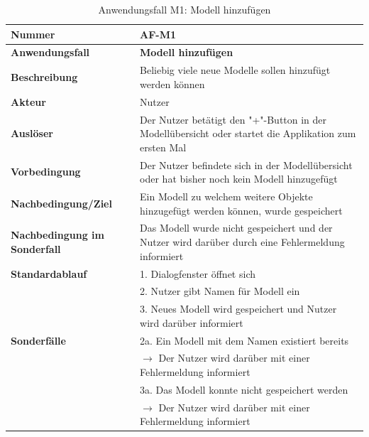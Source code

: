 \documentclass[oneside]{ausarbeitung}
\begin{document}
\begin{table}[htbp]
	\centering
	\begin{tabular}{|l|p{80mm}|}
		\hline
		\textbf{Nummer} & \textbf{AF-M1} \\ \hline
		\textbf{Anwendungsfall} & \textbf{Modell hinzufügen} \\ \hline
		\textbf{Beschreibung} & Beliebig viele neue Modelle sollen hinzufügt werden können \\ \hline
		\textbf{Akteur} & Nutzer \\ \hline
		\textbf{Auslöser} & Der Nutzer betätigt den "+"-Button in der Modellübersicht oder startet die Applikation zum ersten Mal  \\ \hline
		\textbf{Vorbedingung} & Der Nutzer befindete sich in der Modellübersicht oder hat bisher noch kein Modell hinzugefügt  \\ \hline	
		\textbf{Nachbedingung/Ziel} & Ein Modell zu welchem weitere Objekte hinzugefügt werden können, wurde gespeichert \\ \hline
		\textbf{Nachbedingung im Sonderfall} & Das Modell wurde nicht gespeichert und der Nutzer wird darüber durch eine Fehlermeldung informiert \\ \hline
		\textbf{Standardablauf} & 1. Dialogfenster öffnet sich \\ 
		& 2. Nutzer gibt Namen für Modell ein\\
		& 3. Neues Modell wird gespeichert und Nutzer wird darüber informiert\\ \hline
		\textbf{Sonderfälle} & 2a. Ein Modell mit dem  Namen existiert bereits \\ & $\rightarrow$ Der Nutzer wird darüber mit einer Fehlermeldung informiert\\
		& 3a. Das Modell konnte nicht gespeichert werden \\ & $\rightarrow$ Der Nutzer wird darüber mit einer Fehlermeldung informiert \\ \hline
		
	\end{tabular}
	\caption{Anwendungsfall M1: Modell hinzufügen}
	\label{tab:use-case-add-model}
\end{table}
\end{document}
